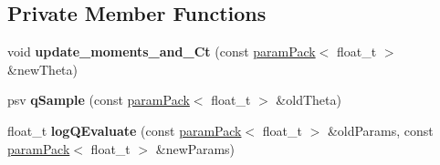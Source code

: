 \subsection*{Private Member Functions}
\begin{DoxyCompactItemize}
\item 
\mbox{\label{classada__rwmh_a42bb58088d56546dac06c2bd0aebda64}} 
void {\bfseries update\+\_\+moments\+\_\+and\+\_\+\+Ct} (const \hyperlink{classparamPack}{param\+Pack}$<$ float\+\_\+t $>$ \&new\+Theta)
\item 
\mbox{\label{classada__rwmh_a765ac73a9cf28f6847e0244149494253}} 
psv {\bfseries q\+Sample} (const \hyperlink{classparamPack}{param\+Pack}$<$ float\+\_\+t $>$ \&old\+Theta)
\item 
\mbox{\label{classada__rwmh_a429aaa769c48191d00ef00d69af803d3}} 
float\+\_\+t {\bfseries log\+Q\+Evaluate} (const \hyperlink{classparamPack}{param\+Pack}$<$ float\+\_\+t $>$ \&old\+Params, const \hyperlink{classparamPack}{param\+Pack}$<$ float\+\_\+t $>$ \&new\+Params)
\end{DoxyCompactItemize}
